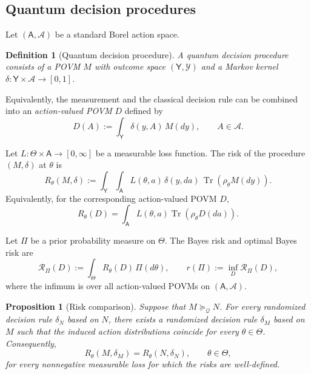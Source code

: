 \documentclass{article}
\newtheorem{prop}[theorem]{Proposition}
\newtheorem{definition}{Definition}
\theoremstyle{named}
\theoremstyle{named1}
\newcommand{\Tr}{\operatorname{Tr}}
\newcommand{\cQ}{\mathcal Q}
\newcommand{\BayesRisk}{\mathcal R_{\Pi}}
\theoremstyle{plain}
\theoremstyle{remark}
\begin{document}
\subsection{Quantum decision procedures}
\label{subsec:quantum-decision-procedures}

Let $(\mathsf A,\mathcal A)$ be a standard Borel action space.

\begin{definition}[Quantum decision procedure]
A quantum decision procedure consists of a POVM $M$ with outcome space
$(\mathsf Y,\mathcal Y)$ and a Markov kernel
$\delta:\mathsf Y\times\mathcal A\to[0,1]$.
\end{definition}

Equivalently, the measurement and the classical decision rule can be
combined into an \emph{action-valued POVM} $D$ defined by
\[
    D(A)
    :=
    \int_{\mathsf Y}\delta(y,A)\,M(dy),
    \qquad A\in\mathcal A.
\]

Let $L:\Theta\times\mathsf A\to[0,\infty]$ be a measurable loss
function. The risk of the procedure $(M,\delta)$ at
$\theta$ is
\[
    R_\theta(M,\delta)
    :=
    \int_{\mathsf Y}\int_{\mathsf A}
    L(\theta,a)\,\delta(y,da)\,
    \Tr\!\left(\rho_\theta M(dy)\right).
\]
Equivalently, for the corresponding action-valued POVM $D$,
\[
    R_\theta(D)
    =
    \int_{\mathsf A}
    L(\theta,a)\Tr\!\left(\rho_\theta D(da)\right).
\]

Let $\Pi$ be a prior probability measure on $\Theta$. The Bayes risk and optimal Bayes risk are
\[
    \BayesRisk(D)
    :=
    \int_\Theta R_\theta(D)\,\Pi(d\theta),
    \qquad
    r(\Pi)
    :=
    \inf_D\BayesRisk(D),
\]
where the infimum is over all action-valued POVMs on
$(\mathsf A,\mathcal A)$.

\begin{prop}[Risk comparison]
\label{prop:risk-transfer}
Suppose that $M\succeq_{\cQ}N$. For every randomized decision rule
$\delta_N$ based on $N$, there exists a randomized decision rule $\delta_M$
based on $M$ such that the induced action distributions coincide for every
$\theta\in\Theta$. Consequently,
\[
    R_\theta(M,\delta_M)
    =
    R_\theta(N,\delta_N),
    \qquad \theta\in\Theta,
\]
for every nonnegative measurable loss for which the risks are well-defined.
\end{prop}
\end{document}
